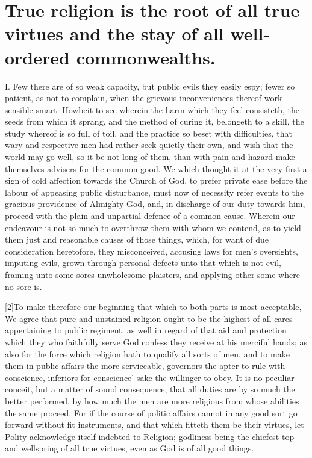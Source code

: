 \section*{True religion is the root of all true virtues and the stay of all well-ordered commonwealths.}
I. Few there are of so weak capacity, but public evils they easily espy; fewer so patient, as not to complain, when the grievous inconveniences thereof work sensible smart. Howbeit to see wherein the harm which they feel consisteth, the seeds from which it sprang, and the method of curing it, belongeth to a skill, the study whereof is so full of toil, and the practice so beset with difficulties, that wary and respective men had rather seek quietly their own, and wish that the world may go well, so it be not long of them, than with pain and hazard make themselves advisers for the common good. We which thought it at the very first a sign of cold affection towards the Church of God, to prefer private ease before the labour of appeasing public disturbance, must now of necessity refer events to the gracious providence of Almighty God, and, in discharge of our duty towards him, proceed with the plain and unpartial defence of a common cause. Wherein our endeavour is not so much to overthrow them with whom we contend, as to yield them just and reasonable causes of those things, which, for want of due consideration heretofore, they misconceived, accusing laws for men’s oversights, imputing evils, grown through personal defects unto that which is not evil, framing unto some sores unwholesome plaisters, and applying other some where no sore is.

[2]To make therefore our beginning that which to both parts is most acceptable, We agree that pure and unstained religion ought to be the highest of all cares appertaining to  public regiment:
 as well in regard of that aid and protection which they who faithfully serve God confess they receive at his merciful hands; as also for the force which religion hath to qualify all sorts of men, and to make them in public affairs the more serviceable, governors the apter to rule with conscience, inferiors for conscience’ sake the willinger to obey. It is no peculiar conceit, but a matter of sound consequence, that all duties are by so much the better performed, by how much the men are more religious from whose abilities the same proceed. For if the course of politic affairs cannot in any good sort go forward without fit instruments, and that which fitteth them be their virtues, let Polity acknowledge itself indebted to Religion; godliness being the chiefest top and wellspring of all true virtues, even as God is of all good things.

